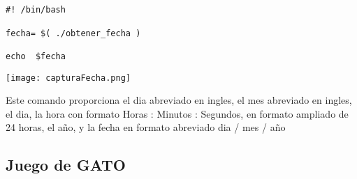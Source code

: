 \documentclass{article}
\begin{document}
\begin{verbatim}


#! /bin/bash

fecha= $( ./obtener_fecha )

echo  $fecha

\end{verbatim}

\texttt{[image: capturaFecha.png]}
\vspace{1cm}

\fontsize{12}{6}\selectfont
\textbf{}
Este comando proporciona el dia abreviado en ingles, el mes abreviado en ingles, el dia, la hora con formato Horas : Minutos : Segundos, en formato ampliado de 24 horas, el año, y la fecha en formato abreviado dia / mes / año  


\subsection{Juego de GATO}
\fontsize{7}{10}\selectfont
\end{document}
